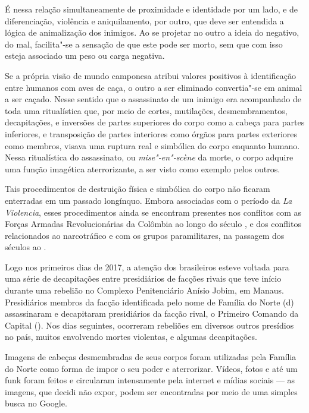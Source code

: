 É nessa relação simultaneamente de proximidade e identidade por um lado,
e de diferenciação, violência e aniquilamento, por outro, que deve ser
entendida a lógica de animalização dos inimigos. Ao se projetar no outro
a ideia do negativo, do mal, facilita"-se a sensação de que este pode ser
morto, sem que com isso esteja associado um peso ou carga negativa.

Se a própria visão de mundo camponesa atribui valores positivos à
identificação entre humanos com aves de caça, o outro a ser eliminado
convertia"-se em animal a ser caçado. Nesse sentido que o assassinato de
um inimigo era acompanhado de toda uma ritualística que, por meio de
cortes, mutilações, desmembramentos, decapitações, e inversões de partes
superiores do corpo como a cabeça para partes inferiores, e transposição
de partes interiores como órgãos para partes exteriores como membros,
visava uma ruptura real e simbólica do corpo enquanto humano. Nessa
ritualística do assassinato, ou \emph{mise"-en"-scène} da morte, o corpo adquire uma função imagética aterrorizante, a ser visto como exemplo pelos outros.

Tais procedimentos de destruição física e simbólica do corpo não
ficaram enterradas em um passado longínquo. Embora associadas com o
período da \emph{La Violencia}, esses procedimentos ainda se encontram
presentes nos conflitos com as Forças Armadas Revolucionárias da
Colômbia ao longo do século , e dos conflitos relacionados ao
narcotráfico e com os grupos paramilitares, na passagem dos séculos 
ao .

\asterisc

Logo nos primeiros dias de 2017, a atenção dos brasileiros esteve
voltada para uma série de decapitações entre presidiários de facções
rivais que teve início durante uma rebelião no Complexo Penitenciário
Anísio Jobim, em Manaus. Presidiários membros da facção identificada
pelo nome de Família do Norte (d) assassinaram e decapitaram
presidiários da facção rival, o Primeiro Comando da Capital (). Nos
dias seguintes, ocorreram rebeliões em diversos outros presídios no
país, muitos envolvendo mortes violentas, e algumas decapitações.

Imagens de cabeças desmembradas de seus corpos foram utilizadas pela
Família do Norte como forma de impor o seu poder e aterrorizar. Vídeos,
fotos e até um funk foram feitos e circularam intensamente pela internet
e mídias sociais --- as imagens, que decidi não expor, podem ser
encontradas por meio de uma simples busca no Google.

